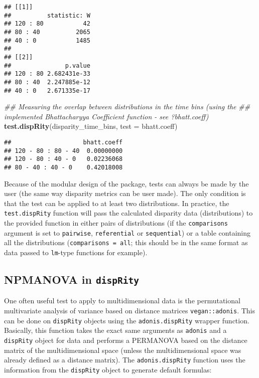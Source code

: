 \documentclass[
]{book}
\newenvironment{Shaded}{\begin{snugshade}}{\end{snugshade}}
\newcommand{\CommentTok}[1]{\textcolor[rgb]{0.56,0.35,0.01}{\textit{#1}}}
\newcommand{\DataTypeTok}[1]{\textcolor[rgb]{0.13,0.29,0.53}{#1}}
\newcommand{\KeywordTok}[1]{\textcolor[rgb]{0.13,0.29,0.53}{\textbf{#1}}}
\newcommand{\NormalTok}[1]{#1}
\begin{document}
\begin{verbatim}
## [[1]]
##          statistic: W
## 120 : 80           42
## 80 : 40          2065
## 40 : 0           1485
## 
## [[2]]
##               p.value
## 120 : 80 2.682431e-33
## 80 : 40  2.247885e-12
## 40 : 0   2.671335e-17
\end{verbatim}

\begin{Shaded}
\begin{Highlighting}[]
\CommentTok{\#\# Measuring the overlap between distributions in the time bins (using the}
\CommentTok{\#\# implemented Bhattacharyya Coefficient function {-} see ?bhatt.coeff)}
\KeywordTok{test.dispRity}\NormalTok{(disparity\_time\_bins, }\DataTypeTok{test =}\NormalTok{ bhatt.coeff)}
\end{Highlighting}
\end{Shaded}

\begin{verbatim}
##                    bhatt.coeff
## 120 - 80 : 80 - 40  0.00000000
## 120 - 80 : 40 - 0   0.02236068
## 80 - 40 : 40 - 0    0.42018008
\end{verbatim}

Because of the modular design of the package, tests can always be made by the user (the same way disparity metrics can be user made).
The only condition is that the test can be applied to at least two distributions.
In practice, the \texttt{test.dispRity} function will pass the calculated disparity data (distributions) to the provided function in either pairs of distributions (if the \texttt{comparisons} argument is set to \texttt{pairwise}, \texttt{referential} or \texttt{sequential}) or a table containing all the distributions (\texttt{comparisons\ =\ all}; this should be in the same format as data passed to \texttt{lm}-type functions for example).

\hypertarget{adonis}{%
\subsection{\texorpdfstring{NPMANOVA in \texttt{dispRity}}{NPMANOVA in dispRity}}\label{adonis}}

One often useful test to apply to multidimensional data is the permutational multivariate analysis of variance based on distance matrices \texttt{vegan::adonis}.
This can be done on \texttt{dispRity} objects using the \texttt{adonis.dispRity} wrapper function.
Basically, this function takes the exact same arguments as \texttt{adonis} and a \texttt{dispRity} object for data and performs a PERMANOVA based on the distance matrix of the multidimensional space (unless the multidimensional space was already defined as a distance matrix).
The \texttt{adonis.dispRity} function uses the information from the \texttt{dispRity} object to generate default formulas:
\end{document}
